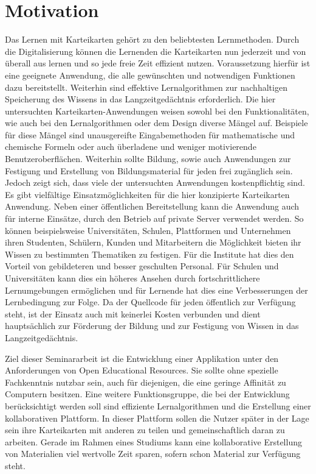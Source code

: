 %
%

\section{Motivation}
Das Lernen mit Karteikarten gehört zu den beliebtesten Lernmethoden. Durch die Digitalisierung können die Lernenden die Karteikarten nun jederzeit und von überall aus lernen und so jede freie Zeit effizient nutzen. Voraussetzung hierfür ist eine geeignete Anwendung, die alle gewünschten und notwendigen Funktionen dazu bereitstellt. Weiterhin sind effektive Lernalgorithmen zur nachhaltigen Speicherung des Wissens in das Langzeitgedächtnis erforderlich. Die hier untersuchten Karteikarten-Anwendungen weisen sowohl bei den Funktionalitäten, wie auch bei den Lernalgorithmen oder dem Design diverse Mängel auf. Beispiele für diese Mängel sind unausgereifte Eingabemethoden für mathematische und chemische Formeln oder auch überladene und weniger motivierende Benutzeroberflächen. Weiterhin sollte Bildung, sowie auch Anwendungen zur Festigung und Erstellung von Bildungsmaterial für jeden frei zugänglich sein. Jedoch zeigt sich, dass viele der untersuchten Anwendungen kostenpflichtig sind.\\

Es gibt vielfältige Einsatzmöglichkeiten für die hier konzipierte Karteikarten Anwendung. Neben einer öffentlichen Bereitstellung kann die Anwendung auch für interne Einsätze, durch den Betrieb auf private Server verwendet werden. So können beispielsweise Universitäten, Schulen, Plattformen und Unternehmen ihren Studenten, Schülern, Kunden und Mitarbeitern die Möglichkeit bieten ihr Wissen zu bestimmten Thematiken zu festigen. Für die Institute hat dies den Vorteil von gebildeteren und besser geschulten Personal. Für Schulen und Universitäten kann dies ein höheres Ansehen durch fortschrittlichere Lernumgebungen ermöglichen und für Lernende hat dies eine Verbesserungen der Lernbedingung zur Folge. Da der Quellcode für jeden öffentlich zur Verfügung steht, ist der Einsatz auch mit keinerlei Kosten verbunden und dient hauptsächlich zur Förderung der Bildung und zur Festigung von Wissen in das Langzeitgedächtnis. 


Ziel dieser Seminararbeit ist die Entwicklung einer Applikation unter den Anforderungen von Open Educational Resources. Sie sollte ohne spezielle Fachkenntnis nutzbar sein, auch für diejenigen, die eine geringe Affinität zu Computern besitzen. Eine weitere Funktionsgruppe, die bei der Entwicklung berücksichtigt werden soll sind effiziente Lernalgorithmen und die Erstellung einer kollaborativen Plattform. In dieser Plattform sollen die Nutzer später in der Lage sein ihre Karteikarten mit anderen zu teilen und gemeinschaftlich daran zu arbeiten. Gerade im Rahmen eines Studiums kann eine kollaborative Erstellung von Materialien viel wertvolle Zeit sparen, sofern schon Material zur Verfügung steht. \\

